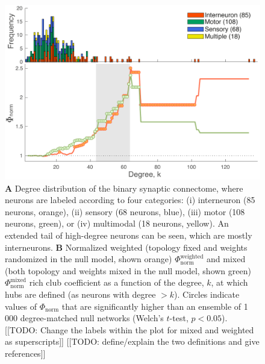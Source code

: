 \documentclass[10pt,letterpaper]{article}
\begin{document}
\begin{figure}[h]
\label{fig:S_weightedRC}
\centering
    \includegraphics[width=1\textwidth]{weightedRCALL.pdf}
    \caption{\textbf{A} Degree distribution of the binary synaptic connectome, where neurons are labeled according to four categories:
(i) interneuron (85 neurons, orange),
(ii) sensory (68 neurons, blue),
(iii) motor (108 neurons, green), or
(iv) multimodal (18 neurons, yellow).
An extended tail of high-degree neurons can be seen, which are mostly interneurons.
\textbf{B}
Normalized weighted (topology fixed and weights randomized in the null model, shown orange) $\Phi_\mathrm{norm}^\mathrm{weighted}$ and mixed (both topology and weights mixed in the null model, shown green) $\Phi_\mathrm{norm}^\mathrm{mixed}$ rich club coefficient as a function of the degree, $k$, at which hubs are defined (as neurons with degree $>k$).
Circles indicate values of $\Phi_\mathrm{norm}$ that are significantly higher than an ensemble of 1\,000 degree-matched null networks (Welch's $t$-test, $p < 0.05$).
[[TODO: Change the labels within the plot for mixed and weighted as superscripts]]
[[TODO: define/explain the two definitions and give references]]
}
\end{figure}
\end{document}

